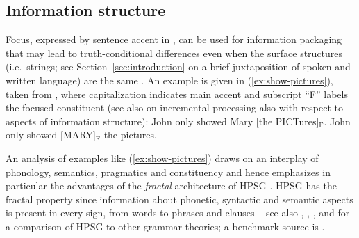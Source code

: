 \documentclass[output=paper,biblatex,babelshorthands,newtxmath,draftmode,colorlinks,citecolor=brown]{langscibook}
\begin{document}
\subsection{Information structure}
\label{sec:information-structure}

Focus, expressed by sentence accent in , can be used for information packaging that may lead to truth-conditional differences even when the surface structures (i.e.\ strings; see Section~\ref{sec:introduction} on a brief juxtaposition of spoken and written language) are the same \citep{Halliday:1967}.
%
An example is given in (\ref{ex:show-pictures}), taken from \citet[]{Krifka:2008}, where capitalization indicates main accent and subscript \enquote{F} labels the focused constituent (see also  on incremental processing also with respect to aspects of information structure):
%
\ea \label{ex:show-pictures}
  \ea John only showed Mary [the PICTures]$_\text{F}$.
  \ex John only showed [MARY]$_\text{F}$ the pictures.
  \z
\z


\noindent An analysis of examples like (\ref{ex:show-pictures}) draws on an interplay of phonology, semantics, pragmatics and constituency and hence emphasizes in particular the advantages of the \emph{fractal} architecture of HPSG \citep{Johnson:Lappin:1999}. 
%
HPSG has the fractal property since
information about phonetic, syntactic and semantic aspects is present in every sign, from words to phrases and clauses \citep[]{Pollard:Sag:1994} -- see also , , ,  and  for a comparison of HPSG to other grammar theories; a benchmark source is \citet{MuellerGT-Eng1}.
\end{document}
